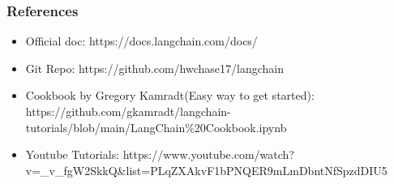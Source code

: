 \begin{frame}[fragile]\frametitle{References}


\begin{itemize}
\item Official doc: https://docs.langchain.com/docs/
\item Git Repo: https://github.com/hwchase17/langchain
\item Cookbook by Gregory Kamradt(Easy way to get started): https://github.com/gkamradt/langchain-tutorials/blob/main/LangChain\%20Cookbook.ipynb
\item Youtube Tutorials: https://www.youtube.com/watch?v=\_v\_fgW2SkkQ\&list=PLqZXAkvF1bPNQER9mLmDbntNfSpzdDIU5
\end{itemize}


\end{frame}